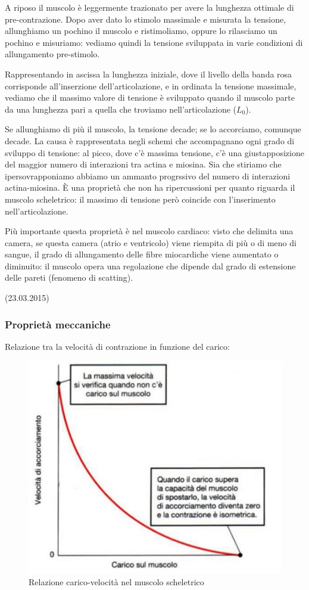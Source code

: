 \documentclass[a4paper,12pt]{article}
\begin{document}
A riposo il muscolo è leggermente trazionato per avere la lunghezza ottimale di pre-contrazione. Dopo aver dato lo stimolo massimale e misurata la tensione, allunghiamo un pochino il muscolo e ristimoliamo, oppure lo rilasciamo un pochino e misuriamo: vediamo quindi la tensione sviluppata in varie condizioni di allungamento pre-stimolo.

Rappresentando in ascissa la lunghezza iniziale, dove il livello della banda rosa corrisponde all'inserzione dell'articolazione, e in ordinata la tensione massimale, vediamo che il massimo valore di tensione è sviluppato quando il muscolo parte da una lunghezza pari a quella che troviamo nell'articolazione ($L_{0}$). 

Se allunghiamo di più il muscolo, la tensione decade; se lo accorciamo, comunque decade. La causa è rappresentata negli schemi che accompagnano ogni grado di sviluppo di tensione: al picco, dove c'è massima tensione, c'è una giustapposizione del maggior numero di interazioni tra actina e miosina. Sia che stiriamo che ipersovrapponiamo abbiamo un ammanto progrssivo del numero di interazioni actina-miosina. È una proprietà che non ha ripercussioni per quanto riguarda il muscolo scheletrico: il massimo di tensione però coincide con l'inserimento nell'articolazione. 

Più importante questa proprietà è nel muscolo cardiaco: visto che delimita una camera, se questa camera (atrio e ventricolo) viene riempita di più o di meno di sangue, il grado di allungamento delle fibre miocardiche viene aumentato o diminuito: il muscolo opera una regolazione che dipende dal grado di estensione delle pareti (fenomeno di scatting).

(23.03.2015)
\subsubsection{Proprietà meccaniche}

Relazione tra la velocità di contrazione in funzione del carico: 
\begin{figure}[H]
\centering
\includegraphics[scale=0.4]{immagine/curva.jpg}
\caption{Relazione carico-velocità nel muscolo scheletrico}
\end{figure}
\end{document}
